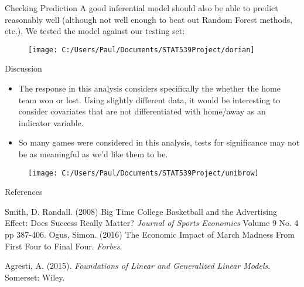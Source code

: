 \documentclass{beamer}
\begin{document}
\begin{frame}{Checking Prediction}
A good inferential model should also be able to predict reasonably well (although not well enough to beat out Random Forest methods, etc.). We tested the model against our testing set: 
\begin{figure}
	\centering
	\texttt{[image: C:/Users/Paul/Documents/STAT539Project/dorian]}
	\end{figure}
\end{frame}

\begin{frame}{Discussion}
\begin{itemize}
\item The response in this analysis considers specifically the whether the home team won or lost. Using slightly different data, it would be interesting to consider covariates that are not differentiated with home/away as an indicator variable.  

\item So many games were considered in this analysis, tests for significance may not be as meaningful as we'd like them to be. 
\end{itemize}
\begin{figure}
	\centering
	\texttt{[image: C:/Users/Paul/Documents/STAT539Project/unibrow]}
\end{figure}
\end{frame}

\begin{frame}{References}
\begin{thebibliography}{4}
Smith, D. Randall. (2008) Big Time College Basketball and the Advertising Effect: Does Success Really Matter? \textit{Journal of Sports Economics} Volume 9 No. 4 pp 387-406.
Ogus, Simon. (2016) The Economic Impact of March Madness From First Four to Final Four. \textit{Forbes}. 

Agresti, A. (2015). \textit{Foundations of Linear and Generalized Linear Models}. Somerset: Wiley.
\end{thebibliography}

\end{frame}
	
\end{document}
